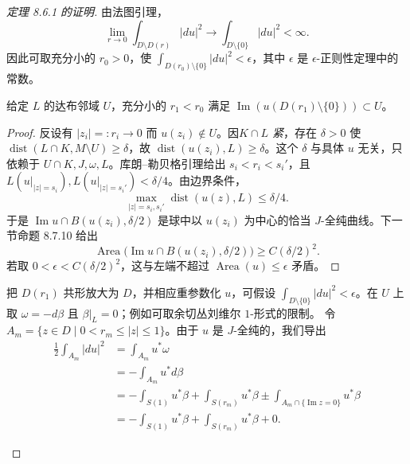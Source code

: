 \begin{proof}[定理 8.6.1 的证明]
由法图引理，
\[
 \lim_{r\to0}\int_{D\setminus D(r)}|du|^2
 \longrightarrow\int_{D\setminus\{0\}}|du|^2<\infty.
\]
因此可取充分小的 $r_0>0$，使
$\int_{D(r_0)\setminus\{0\}}|du|^2<\epsilon$，其中 $\epsilon$ 是
$\epsilon$-正则性定理中的常数。
\begin{lemma}\label{lem:ch8-image-enters-darboux-neighborhood}
给定 $L$ 的达布邻域 $U$，充分小的 $r_1<r_0$ 满足
$\operatorname{Im}(u(D(r_1)\setminus\{0\}))\subset U$。
\end{lemma}
\begin{proof}
反设有 $|z_i|=:r_i\to0$ 而 $u(z_i)\notin U$。因\emph{$K\cap L$ 紧}，存在
$\delta>0$ 使 $\operatorname{dist}(L\cap K,M\setminus U)\geq\delta$，故
$\operatorname{dist}(u(z_i),L)\geq\delta$。这个 $\delta$ 与具体 $u$ 无关，只依赖于
$U\cap K,J,\omega,L$。库朗--勒贝格引理给出 $s_i<r_i<s_i'$，且
$L(u|_{|z|=s_i}),L(u|_{|z|=s_i'})<\delta/4$。由边界条件，
\[
 \max_{|z|=s_i,s_i'}\operatorname{dist}(u(z),L)\leq\delta/4.
\]
于是 $\operatorname{Im}u\cap B(u(z_i),\delta/2)$ 是球中以 $u(z_i)$ 为中心的恰当
$J$-全纯曲线。下一节命题 8.7.10 给出
\[
 \operatorname{Area}\bigl(\operatorname{Im}u\cap B(u(z_i),\delta/2)\bigr)
 \geq C(\delta/2)^2.
\]
若取 $0<\epsilon<C(\delta/2)^2$，这与左端不超过
$\operatorname{Area}(u)\leq\epsilon$ 矛盾。
\end{proof}
把 $D(r_1)$ 共形放大为 $D$，并相应重参数化 $u$，可假设
$\int_{D\setminus\{0\}}|du|^2<\epsilon$。在 $U$ 上取
$\omega=-d\beta$ 且 $\beta|_L=0$；例如可取余切丛刘维尔 $1$-形式的限制。
令 $A_m=\{z\in D\mid0<r_m\leq|z|\leq1\}$。由于 $u$ 是 $J$-全纯的，我们导出
\begin{equation}
 \begin{split}
 \frac12\int_{A_m}|du|^2
 &=\int_{A_m}u^*\omega\\
 &=-\int_{A_m}u^*d\beta\\
 &=-\int_{S(1)}u^*\beta+\int_{S(r_m)}u^*\beta
   \pm\int_{A_m\cap\{\operatorname{Im}z=0\}}u^*\beta\\
 &=-\int_{S(1)}u^*\beta+\int_{S(r_m)}u^*\beta+0.
 \end{split}
 \label{eq:ch8-semiannulus-stokes}
\end{equation}
\begin{figure}[htbp]\centering
{}

\end{figure}
\end{proof}
